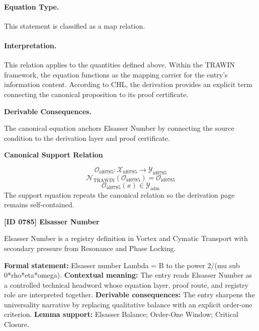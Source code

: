 \paragraph{Equation Type.}
This statement is classified as a map relation.

\paragraph{Interpretation.}
This relation applies to the quantities defined above. Within the TRAWIN framework, the equation functions as the mapping carrier for the entry’s information content. According to CHL, the derivation provides an explicit term connecting the canonical proposition to its proof certificate.

\par\vspace{0.35em}
\noindent\textbf{Derivable Consequences.}\quad
\begingroup
\footnotesize
\raggedright
The canonical equation anchors Elsasser Number by connecting the source condition to the derivation layer and proof certificate.
\par\endgroup

\noindent\textbf{Canonical Support Relation}\par
\[
\mathcal{O}_{\mathrm{id0785}}:\mathcal{X}_{\mathrm{id0785}}\longrightarrow\mathcal{Y}_{\mathrm{id0785}}
\]
\[
\mathcal{N}_{\mathrm{TRAWIN}}(\mathcal{O}_{\mathrm{id0785}})=\mathcal{O}_{\mathrm{id0785}}
\]
\[
\mathcal{O}_{\mathrm{id0785}}(x)\in\mathcal{Y}_{\mathrm{adm}}
\]
\noindent The support equation repeats the canonical relation so the derivation page remains self-contained.\par

\clearpage
\noindent\textbf{[ID 0785] Elsasser Number}\par
\vspace{0.35em}
\begingroup\small
{}
Elsasser Number is a registry definition in Vortex and Cymatic Transport with secondary pressure from Resonance and Phase Locking.

\begingroup\footnotesize\setlength{\emergencystretch}{3em}\sloppy
\textbf{Formal statement:} Elsasser number Lambda = B to the power 2/(mu sub 0*rho*eta*omega). \textbf{Contextual meaning:} The entry reads Elsasser Number as a controlled technical headword whose equation layer, proof route, and registry role are interpreted together. \textbf{Derivable consequences:} The entry sharpens the universality narrative by replacing qualitative balance with an explicit order-one criterion. \textbf{Lemma support:} Elsasser Balance; Order-One Window; Critical Closure.\par
\endgroup

